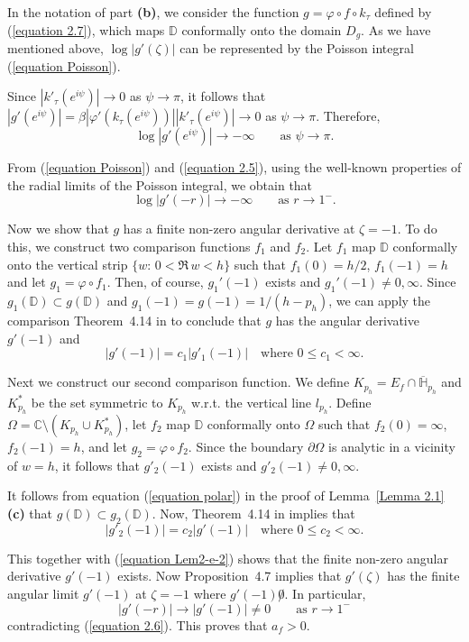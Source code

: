 \documentclass[mn,a4paper,fleqn]{w-art}
\newcommand{\be}{\begin{equation}}
\newcommand{\ee}{\end{equation}}
\begin{document}
{In the notation of part \textbf{(b)}, we consider the function
$g=\varphi\circ f\circ k_\tau$ defined by (\ref{equation 2.7}),
which maps $\mathbb{D}$ conformally onto the domain $D_g$. As we
have mentioned above,
 $\log |g'(\zeta)|$ can be represented
by the Poisson integral (\ref{equation Poisson}).%

Since $|k'_\tau(e^{i\psi})|\to 0$ as $\psi\to \pi$, it follows
that
$|g'(e^{i\psi})|=\beta|\varphi'(k_\tau(e^{i\psi}))||k'_\tau(e^{i\psi})|\to
0$ as $\psi\to \pi$. Therefore, %
\be \label{equation 2.5} %
\log|g'(e^{i\psi})|\to -\infty \quad \quad {\mbox{as $\psi\to
\pi$.}}  %
\ee  %

From  (\ref{equation Poisson}) and (\ref{equation 2.5}), using the
well-known properties of the radial limits of the Poisson
integral, we  obtain that %
\be \label{equation 2.6} %
\log|g'(-r)|\to -\infty \quad \quad {\mbox{as $r\to 1^-$.}}  %
\ee  %



Now we show that $g$ has a finite non-zero angular derivative at
$\zeta=-1$. To do this, we construct two comparison functions
$f_1$ and $f_2$. Let $f_1$ map $\mathbb{D}$ conformally onto the
vertical strip $\{w:\,0<\Re\,w<h\}$ such that $f_1(0)=h/2$,
$f_1(-1)=h$ and let $g_1=\varphi\circ f_1$. Then, of course,
$g_1'(-1)$ exists and $g_1'(-1)\not=0,\infty$. Since $g_1(\mathbb{D})\subset
g(\mathbb{D})$ and $g_1(-1)=g(-1)=1/(h-p_h)$, we can apply the
comparison Theorem~4.14 in \cite{P} to conclude that $g$ has the
angular
derivative $g'(-1)$ and %
\be  \label{equation Lem2-e-2} %
|g'(-1)|=c_1|g'_1(-1)| \quad {\mbox{where $0\le c_1<\infty$.}}  %
\ee  %

Next we construct our second comparison function.  We define
$K_{p_h}=E_f\cap \overline{\mathbb{H}}_{p_h}$ and $K^*_{p_h}$
be the set symmetric to $K_{p_h}$ w.r.t. the vertical line
$l_{p_h}$. Define $\Omega=\mathbb{C}\setminus\left(K_{p_h}\cup
K^*_{p_h}\right)$, let $f_2$ map $\mathbb{D}$ conformally onto
$\Omega$ such that $f_2(0)=\infty$, $f_2(-1)=h$, and let
$g_2=\varphi\circ f_2$. Since the boundary $\partial \Omega$ is
analytic in a vicinity of $w=h$, it follows that
$g'_2(-1)$ exists and $g'_2(-1)\not=0,\infty$.

It follows from equation (\ref{equation polar}) in the proof of
Lemma~\ref{Lemma 2.1}\textbf{(c)} that $g(\mathbb{D})\subset
g_2(\mathbb{D})$. Now, Theorem~4.14 in
\cite{P} implies that %
$$  %
|g'_2(-1)|=c_2|g'(-1)| \quad {\mbox{where $0\le c_2<\infty$.}}  %
$$  %


This together with (\ref{equation Lem2-e-2}) shows that the finite
non-zero angular derivative  $g'(-1)$ exists. Now Proposition~4.7
\cite{P} implies that $g'(\zeta)$ has the finite
angular limit $g'(-1)$ at $\zeta=-1$ where $g'(-1)\not 0$. In particular, %
$$ %
|g'(-r)|\to |g'(-1)|\not=0 \quad \quad {\mbox{as $r\to 1^-$}} %
$$  %
contradicting (\ref{equation 2.6}). This proves that
$a_f>0$.


}
\end{document}

